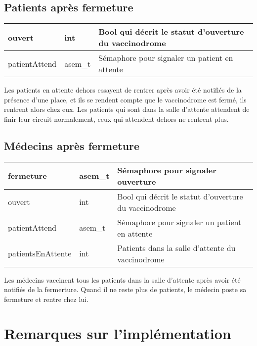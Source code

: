 \documentclass[a4paper]{article}
\makeatletter
\newenvironment{expl}{%
  \begin{list}{}{%
      \small\itshape%
      \topsep\z@%
      \listparindent0pt%
      \parsep0.75\baselineskip%
      \setlength{\leftmargin}{20mm}%
      \setlength{\rightmargin}{20mm}%
    }
  \item[]}%
  {\end{list}}
\makeatother
\begin{document}
\subsection{Patients après fermeture}

\begin{expl}
  \begin{tabularx}{\linewidth}{|l|l|>{\strut}X|}
      \hline%
        ouvert & int & Bool qui décrit le statut d'ouverture du vaccinodrome \\ \hline%
        patientAttend & asem\_t & Sémaphore pour signaler un patient en attente \\ \hline%
    \end{tabularx}
    
    Les patients en attente dehors essayent de rentrer après avoir été notifiés de la présence d'une place, et ils se rendent compte que le vaccinodrome est fermé, ils rentrent alors chez eux.
    Les patients qui sont dans la salle d'attente attendent de finir leur circuit normalement, ceux qui attendent dehors ne rentrent plus. 
    
\end{expl}

\subsection{Médecins après fermeture}

\begin{expl}
  \begin{tabularx}{\linewidth}{|l|l|>{\strut}X|}
      \hline%
        fermeture & asem\_t  & Sémaphore pour signaler ouverture \\ \hline%
        ouvert & int & Bool qui décrit le statut d'ouverture du vaccinodrome \\ \hline%
        patientAttend & asem\_t & Sémaphore pour signaler un patient en attente \\ \hline%
        patientsEnAttente & int & Patients dans la salle d'attente du vaccinodrome \\ \hline%
    \end{tabularx}
     
    Les médecins vaccinent tous les patients dans la salle d'attente après avoir été notifiés de la fermerture.
    Quand il ne reste plus de patients, le médecin poste sa fermeture et rentre chez lui.
\end{expl}

\section{Remarques sur l'implémentation}
\end{document}
